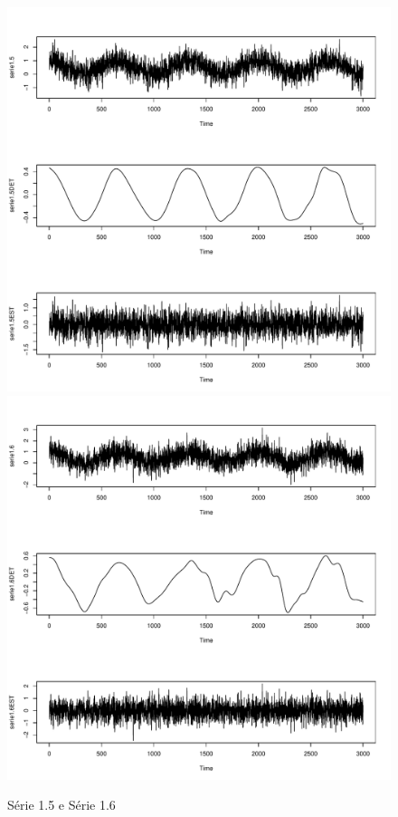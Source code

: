 \graphicspath{{imagens/}}
\begin{figure}[H]
\begin{center}
  \includegraphics[scale=0.43]{serie1_5.pdf} \quad
  \includegraphics[scale=0.43]{serie1_6.pdf}
  \caption{Série 1.5 e Série 1.6}

\end{center}
\end{figure}


